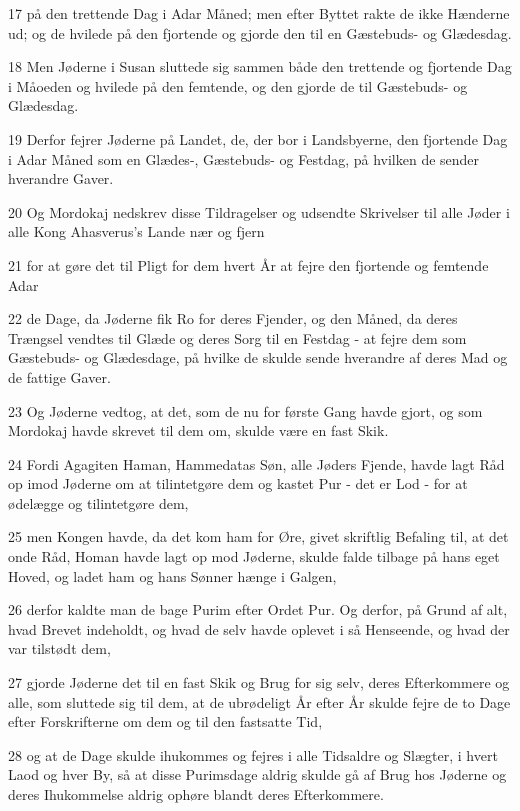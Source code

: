 \par 17 på den trettende Dag i Adar Måned; men efter Byttet rakte de ikke Hænderne ud; og de hvilede på den fjortende og gjorde den til en Gæstebuds- og Glædesdag.
\par 18 Men Jøderne i Susan sluttede sig sammen både den trettende og fjortende Dag i Måoeden og hvilede på den femtende, og den gjorde de til Gæstebuds- og Glædesdag.
\par 19 Derfor fejrer Jøderne på Landet, de, der bor i Landsbyerne, den fjortende Dag i Adar Måned som en Glædes-, Gæstebuds- og Festdag, på hvilken de sender hverandre Gaver.
\par 20 Og Mordokaj nedskrev disse Tildragelser og udsendte Skrivelser til alle Jøder i alle Kong Ahasverus's Lande nær og fjern
\par 21 for at gøre det til Pligt for dem hvert År at fejre den fjortende og femtende Adar
\par 22 de Dage, da Jøderne fik Ro for deres Fjender, og den Måned, da deres Trængsel vendtes til Glæde og deres Sorg til en Festdag - at fejre dem som Gæstebuds- og Glædesdage, på hvilke de skulde sende hverandre af deres Mad og de fattige Gaver.
\par 23 Og Jøderne vedtog, at det, som de nu for første Gang havde gjort, og som Mordokaj havde skrevet til dem om, skulde være en fast Skik.
\par 24 Fordi Agagiten Haman, Hammedatas Søn, alle Jøders Fjende, havde lagt Råd op imod Jøderne om at tilintetgøre dem og kastet Pur - det er Lod - for at ødelægge og tilintetgøre dem,
\par 25 men Kongen havde, da det kom ham for Øre, givet skriftlig Befaling til, at det onde Råd, Homan havde lagt op mod Jøderne, skulde falde tilbage på hans eget Hoved, og ladet ham og hans Sønner hænge i Galgen,
\par 26 derfor kaldte man de bage Purim efter Ordet Pur. Og derfor, på Grund af alt, hvad Brevet indeholdt, og hvad de selv havde oplevet i så Henseende, og hvad der var tilstødt dem,
\par 27 gjorde Jøderne det til en fast Skik og Brug for sig selv, deres Efterkommere og alle, som sluttede sig til dem, at de ubrødeligt År efter År skulde fejre de to Dage efter Forskrifterne om dem og til den fastsatte Tid,
\par 28 og at de Dage skulde ihukommes og fejres i alle Tidsaldre og Slægter, i hvert Laod og hver By, så at disse Purimsdage aldrig skulde gå af Brug hos Jøderne og deres Ihukommelse aldrig ophøre blandt deres Efterkommere.
